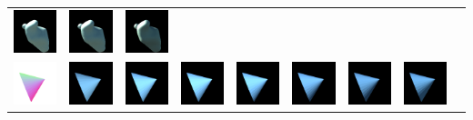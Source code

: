 \begin{center}
\begin{longtable}{@{}c@{}c@{}c@{}c@{}c@{}c@{}c@{}c@{}c@{}}
\includegraphics[width=0.1\linewidth]{training/11_5.png} & \includegraphics[width=0.1\linewidth]{training/11_6.png} &
\includegraphics[width=0.1\linewidth]{training/11_7.png} \\
\includegraphics[width=0.1\linewidth]{training/12_gt.png} & \includegraphics[width=0.1\linewidth]{training/12_0.png} &
\includegraphics[width=0.1\linewidth]{training/12_1.png} & \includegraphics[width=0.1\linewidth]{training/12_2.png} &
\includegraphics[width=0.1\linewidth]{training/12_3.png} & \includegraphics[width=0.1\linewidth]{training/12_4.png} &
\includegraphics[width=0.1\linewidth]{training/12_5.png} & \includegraphics[width=0.1\linewidth]{training/12_6.png} &

\end{longtable}
\end{center}
